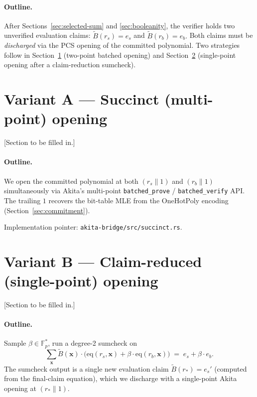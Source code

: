 \documentclass[11pt,a4paper]{article}
\theoremstyle{definition}
\theoremstyle{remark}
\newcommand{\akF}{\mathbb{F}_{p}}                %
\newcommand{\eq}{\mathrm{eq}}                    %
\newcommand{\MLE}[1]{\widetilde{#1}}              %
\newcommand{\BitTable}{B}                         %
\newcommand{\selectedPoint}{r_s}                  %
\newcommand{\boolPoint}{r_b}                      %
\newcommand{\reducedPoint}{r_*}                   %
\newcommand{\evalSelected}{e_s}                   %
\newcommand{\evalBool}{e_b}                       %
\begin{document}
\paragraph{Outline.}
After Sections~\ref{sec:selected-sum} and \ref{sec:booleanity}, the
verifier holds two unverified evaluation claims:
\(
   \MLE{\BitTable}(\selectedPoint) = \evalSelected
\)
and
\(
   \MLE{\BitTable}(\boolPoint) = \evalBool.
\)
Both claims must be \emph{discharged} via the PCS opening of the
committed polynomial. Two strategies follow in
Section~\ref{sec:variant-succinct} (two-point batched opening) and
Section~\ref{sec:variant-claim-reduced} (single-point opening after a
claim-reduction sumcheck).


\section{Variant A — Succinct (multi-point) opening}
\label{sec:variant-succinct}

\textsf{[Section to be filled in.]}

\paragraph{Outline.}
We open the committed polynomial at both $(\selectedPoint \| 1)$ and
$(\boolPoint \| 1)$ simultaneously via Akita's multi-point
\verb|batched_prove| / \verb|batched_verify| API. The trailing $1$
recovers the bit-table MLE from the OneHotPoly encoding
(Section~\ref{sec:commitment}).

Implementation pointer: \verb|akita-bridge/src/succinct.rs|.


\section{Variant B — Claim-reduced (single-point) opening}
\label{sec:variant-claim-reduced}

\textsf{[Section to be filled in.]}

\paragraph{Outline.}
Sample $\beta \in \akF^*$, run a degree-2 sumcheck on
\[
   \sum_{\mathbf{x}} \MLE{\BitTable}(\mathbf{x}) \cdot
   \bigl(\eq(\selectedPoint, \mathbf{x}) + \beta \cdot
        \eq(\boolPoint, \mathbf{x})\bigr)
   \;=\; \evalSelected + \beta \cdot \evalBool.
\]
The sumcheck output is a single new evaluation claim
$\MLE{\BitTable}(\reducedPoint) = \evalSelected'$ (computed from the
final-claim equation), which we discharge with a single-point Akita
opening at $(\reducedPoint \| 1)$.
\end{document}
